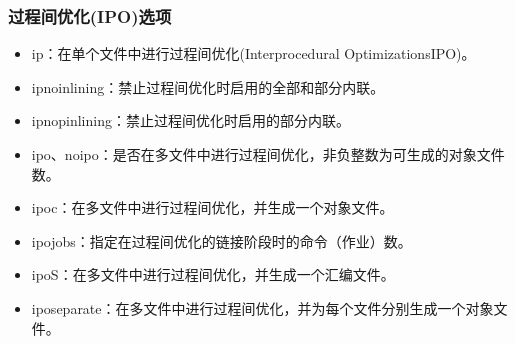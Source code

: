 \documentclass[a4paper,12pt,english]{sphinxmanual}
\begin{document}
\subsubsection{过程间优化(IPO)选项}
\label{\detokenize{compiler/intel:ipo}}\begin{itemize}
\item {} 
\sphinxAtStartPar
\sphinxhyphen{}ip：在单个文件中进行过程间优化(Interprocedural Optimizations\sphinxhyphen{}IPO)。

\item {} 
\sphinxAtStartPar
\sphinxhyphen{}ip\sphinxhyphen{}no\sphinxhyphen{}inlining：禁止过程间优化时启用的全部和部分内联。

\item {} 
\sphinxAtStartPar
\sphinxhyphen{}ip\sphinxhyphen{}no\sphinxhyphen{}pinlining：禁止过程间优化时启用的部分内联。

\item {} 
\sphinxAtStartPar
\sphinxhyphen{}ipo\sphinxstyleemphasis{{[}n{]}}、\sphinxhyphen{}no\sphinxhyphen{}ipo：是否在多文件中进行过程间优化，非负整数为可生成的对象文件数。

\item {} 
\sphinxAtStartPar
\sphinxhyphen{}ipo\sphinxhyphen{}c：在多文件中进行过程间优化，并生成一个对象文件。

\item {} 
\sphinxAtStartPar
\sphinxhyphen{}ipo\sphinxhyphen{}jobs：指定在过程间优化的链接阶段时的命令（作业）数。

\item {} 
\sphinxAtStartPar
\sphinxhyphen{}ipo\sphinxhyphen{}S：在多文件中进行过程间优化，并生成一个汇编文件。

\item {} 
\sphinxAtStartPar
\sphinxhyphen{}ipo\sphinxhyphen{}separate：在多文件中进行过程间优化，并为每个文件分别生成一个对象文件。

\end{itemize}
\end{document}
